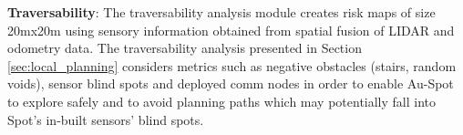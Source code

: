 \documentclass[letterpaper, 10pt, conference]{ieeeconf}      %
\newcommand{\ph}[1]{{\textbf{#1}:}} %
\newcommand{\rev}[1]{{\color{blue} #1 }} %
\begin{document}





\ph{Traversability}
The traversability analysis module creates risk maps of size 20mx20m using sensory information obtained from spatial fusion of LIDAR and odometry data.
The traversability analysis presented in Section \ref{sec:local_planning} considers metrics such as negative obstacles (stairs, random voids), sensor blind spots and deployed comm nodes in order to enable Au-Spot to explore safely and to avoid planning paths which may potentially fall into Spot's in-built sensors' blind spots.  %
\end{document}

